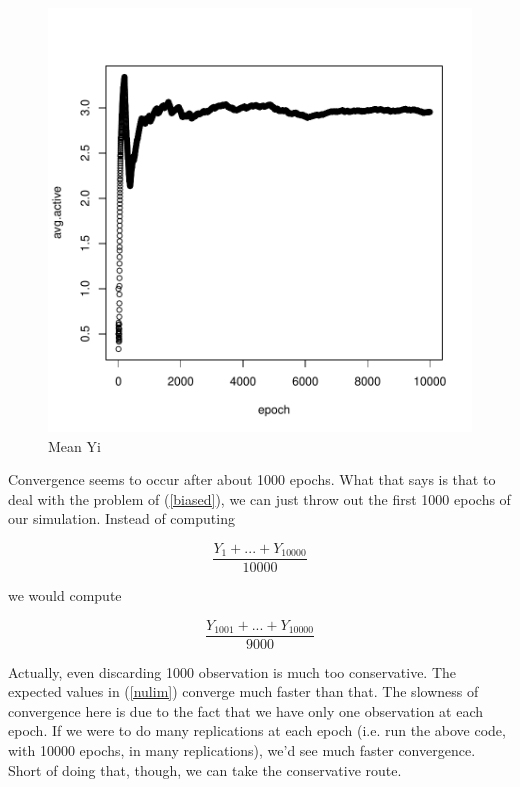 \begin{figure}[tb]
\centerline{
\includegraphics{Cesaro2.pdf}
}
\caption{Mean Yi}
\label{meanyi}
\end{figure}

Convergence seems to occur after about 1000 epochs.  What that says is
that to deal with the problem of (\ref{biased}), we can just throw out
the first 1000 epochs of our simulation.  Instead of computing

\begin{equation}
\label{ces1}
\frac{Y_1+...+Y_{10000}}{10000}
\end{equation}

we would compute

\begin{equation}
\label{ces2}
\frac{Y_{1001}+...+Y_{10000}}{9000}
\end{equation}

Actually, even discarding 1000 observation is much too conservative.
The expected values in (\ref{nulim}) converge much faster than that.
The slowness of convergence here is due to the fact that we have only
one observation at each epoch.  If we were to do many replications at
each epoch (i.e.  run the above code, with 10000 epochs, in many
replications), we'd see much faster convergence.  Short of doing that,
though, we can take the conservative route.

